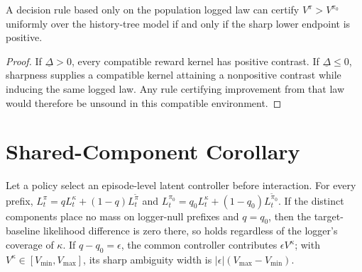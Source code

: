 \begin{corollary}
A decision rule based only on the population logged law can certify $V^\pi>V^{\pi_0}$ uniformly over the history-tree model if and only if the sharp lower endpoint is positive.
\end{corollary}
\begin{proof}
If $\underline\Delta>0$, every compatible reward kernel has positive contrast. If $\underline\Delta\le0$, sharpness supplies a compatible kernel attaining a nonpositive contrast while inducing the same logged law. Any rule certifying improvement from that law would therefore be unsound in this compatible environment.
\end{proof}

\section{Shared-Component Corollary}

Let a policy select an episode-level latent controller before interaction. For every prefix,
$L_t^\pi=qL_t^\kappa+(1-q)L_t^{\widetilde\pi}$ and
$L_t^{\pi_0}=q_0L_t^\kappa+(1-q_0)L_t^{\widetilde\pi_0}$.
If the distinct components place no mass on logger-null prefixes and $q=q_0$, then the target-baseline likelihood difference is zero there, so \UCC holds regardless of the logger's coverage of $\kappa$. If $q-q_0=\epsilon$, the common controller contributes $\epsilon V^\kappa$; with $V^\kappa\in[V_{\min},V_{\max}]$, its sharp ambiguity width is $|\epsilon|(V_{\max}-V_{\min})$.

